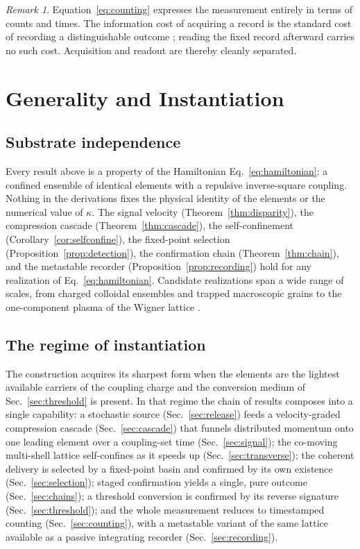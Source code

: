 \documentclass[twocolumn,10pt,a4paper]{article}
\theoremstyle{thmstyle}
\theoremstyle{definition}
\theoremstyle{remark}
\newtheorem{remark}[theorem]{Remark}
\begin{document}
\begin{remark}
Equation~\eqref{eq:counting} expresses the measurement entirely in terms of
counts and times. The information cost of acquiring a record is the standard
cost of recording a distinguishable outcome \citep{landauer1961}; reading the
fixed record afterward carries no such cost. Acquisition and readout are
thereby cleanly separated.
\end{remark}

\section{Generality and Instantiation}
\label{sec:discussion}

\subsection{Substrate independence}

Every result above is a property of the Hamiltonian
Eq.~\eqref{eq:hamiltonian}: a confined ensemble of identical elements with a
repulsive inverse-square coupling. Nothing in the derivations fixes the
physical identity of the elements or the numerical value of $\kappa$. The
signal velocity (Theorem~\ref{thm:disparity}), the compression cascade
(Theorem~\ref{thm:cascade}), the self-confinement (Corollary~\ref{cor:selfconfine}),
the fixed-point selection (Proposition~\ref{prop:detection}), the confirmation
chain (Theorem~\ref{thm:chain}), and the metastable recorder
(Proposition~\ref{prop:recording}) hold for any realization of
Eq.~\eqref{eq:hamiltonian}. Candidate realizations span a wide range of scales,
from charged colloidal ensembles and trapped macroscopic grains to the
one-component plasma of the Wigner lattice \citep{wigner1934,dubin1999,birkl1992}.

\subsection{The regime of instantiation}

The construction acquires its sharpest form when the elements are the
lightest available carriers of the coupling charge and the conversion medium
of Sec.~\ref{sec:threshold} is present. In that regime the chain of results
composes into a single capability: a stochastic source
(Sec.~\ref{sec:release}) feeds a velocity-graded compression cascade
(Sec.~\ref{sec:cascade}) that funnels distributed momentum onto one leading
element over a coupling-set time (Sec.~\ref{sec:signal}); the co-moving
multi-shell lattice self-confines as it speeds up
(Sec.~\ref{sec:transverse}); the coherent delivery is selected by a
fixed-point basin and confirmed by its own existence
(Sec.~\ref{sec:selection}); staged confirmation yields a single, pure outcome
(Sec.~\ref{sec:chains}); a threshold conversion is confirmed by its reverse
signature (Sec.~\ref{sec:threshold}); and the whole measurement reduces to
timestamped counting (Sec.~\ref{sec:counting}), with a metastable variant of
the same lattice available as a passive integrating recorder
(Sec.~\ref{sec:recording}).
\end{document}
